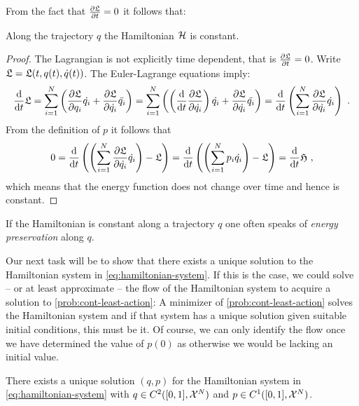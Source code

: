 From the fact that $\frac{\partial \mathfrak{L}}{\partial t} = 0$ it follows that:
\begin{corollary}
	\label{cor:energy-preservation}
	Along the trajectory $q$ the Hamiltonian $\mathcal{H}$ is constant.
\end{corollary}
\begin{proof}
	The Lagrangian is not explicitly time dependent, that is $\frac{\partial \mathfrak{L}}{\partial t} = 0$.
	Write $\mathfrak{L} = \mathfrak{L}(t, q(t), \dot{q}(t))$.
	The Euler-Lagrange equations imply:
	\begin{equation}
		\frac{\mathrm{d}}{\mathrm{d} t} \mathfrak{L} = \sum_{i=1}^{N}\left(\frac{\partial \mathfrak{L}}{\partial q_i} \dot{q_i} + \frac{\partial \mathfrak{L}}{\partial \dot{q_i}} \ddot{q_i} \right )
		=\sum_{i=1}^{N}\left( \left( \frac{\mathrm{d}}{\mathrm{d} t} \frac{\partial \mathfrak{L}}{\partial \dot{q_i}} 
		\right)\dot{q_i}+ \frac{\partial \mathfrak{L}}{\partial \dot{q_i}} \ddot{q_i}\right )
		= \frac{\mathrm{d}}{\mathrm{d} t} \left(\sum_{i=1}^{N} \frac{\partial \mathfrak{L}}{\partial \dot{q_i}} \dot{q_i}\right) \ .
	\end{equation}
	From the definition of $p$ it follows that
	\begin{equation}
		0 = \frac{\mathrm{d}}{\mathrm{d} t} \left( \left(\sum_{i=1}^{N} \frac{\partial \mathfrak{L}}{\partial \dot{q_i}} \dot{q_i} \right) -  \mathfrak{L} \right) 
		= \frac{\mathrm{d}}{\mathrm{d} t} \left( \left(\sum_{i=1}^{N} p_i \dot{q_i} \right ) - \mathfrak{L} \right)
		= \frac{\mathrm{d}}{\mathrm{d} t} \mathfrak{H} \ ,
	\end{equation}
	which means that the energy function does not change over time and hence is constant.
\end{proof}
If the Hamiltonian is constant along a trajectory $q$ one often speaks of \emph{energy preservation} along $q$.

Our next task will be to show that there exists a unique solution to the Hamiltonian system in \cref{eq:hamiltonian-system}.
If this is the case, we could solve -- or at least approximate -- the flow of the Hamiltonian system to acquire a solution to \cref{prob:cont-least-action}:
A minimizer of \cref{prob:cont-least-action} solves the Hamiltonian system and if that system has a unique solution given suitable initial conditions, this must be it.
Of course, we can only identify the flow once we have determined the value of $p(0)$ as otherwise we would be lacking an initial value.

\begin{theorem}
	There exists a unique solution $(q, p)$ for the Hamiltonian system in \cref{eq:hamiltonian-system} with $q \in C^2([0, 1], \mathcal{X}^N)$ and $p \in C^1([0, 1], \mathcal{X}^N)$.
\end{theorem}

